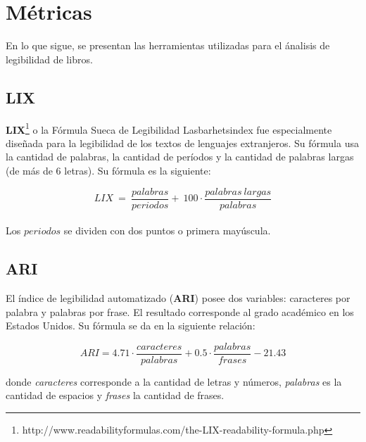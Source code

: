\documentclass[12pt,journal,compsoc]{IEEEtran}
\begin{document}

\section{Métricas}

En lo que sigue, se presentan las herramientas utilizadas para el ánalisis de legibilidad de libros.

\subsection{LIX}

\textbf{LIX}\footnote{http://www.readabilityformulas.com/the-LIX-readability-formula.php} o la Fórmula Sueca de Legibilidad Lasbarhetsindex fue especialmente diseñada para la legibilidad de los textos de lenguajes extranjeros. Su fórmula usa la cantidad de palabras, la cantidad de períodos y la cantidad de palabras largas (de más de 6 letras). Su fórmula es la siguiente:

$$LIX\ =\ \frac{palabras}{periodos} + \ 100 \cdot \frac{palabras\ largas}{palabras}$$\\

Los $periodos$ se dividen con dos puntos o primera mayúscula.\\

\subsection{ARI}
El índice de legibilidad automatizado (\textbf{ARI}) posee dos variables: caracteres por palabra y palabras por frase. El resultado corresponde al grado académico en los Estados Unidos. Su fórmula se da en la siguiente relación:

$$ARI = 4.71\cdot \frac{caracteres}{palabras}+0.5\cdot \frac{palabras}{frases} - 21.43$$

donde \textit{caracteres} corresponde a la cantidad de letras y números, \textit{palabras} es la cantidad de espacios y \textit{frases} la cantidad de frases.
\end{document}
